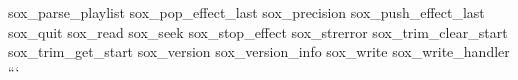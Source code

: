 sox\+\_\+parse\+\_\+playlist sox\+\_\+pop\+\_\+effect\+\_\+last sox\+\_\+precision sox\+\_\+push\+\_\+effect\+\_\+last sox\+\_\+quit sox\+\_\+read sox\+\_\+seek sox\+\_\+stop\+\_\+effect sox\+\_\+strerror sox\+\_\+trim\+\_\+clear\+\_\+start sox\+\_\+trim\+\_\+get\+\_\+start sox\+\_\+version sox\+\_\+version\+\_\+info sox\+\_\+write sox\+\_\+write\+\_\+handler ``` 